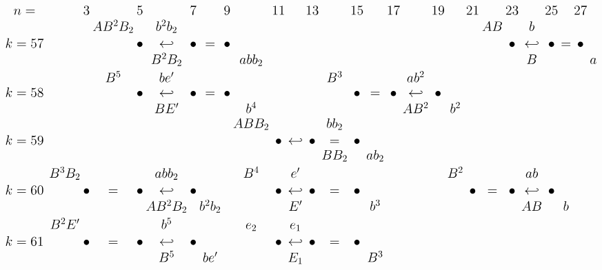 \documentclass{article}
\begin{document}
\(
\begin{tikzcd}[
nodes={font=\Large,inner sep=0pt},
row sep=0.2cm,
column sep=0.1cm
]
n=& && 3 & & 5 & & 7 & & 9 & & 11 & & 13 & & 15 & & 17 & & 19 & & 21 & & 23 && 25 && 27 \\
 && && AB^2B_2 && b^2b_2 && && && && && && && && AB && b \\
k=57& && && \bullet & \hookleftarrow & \bullet &=& \bullet && && && && && && && \bullet & \hookleftarrow & \bullet &=& \bullet \\
& & && && B^2B_2 && && abb_2 && && && && && && && B && && a \\
&& && B^5 && be' && && && && B^3 && && ab^2 \\
k=58& && && \bullet & \hookleftarrow & \bullet &=& \bullet && && && \bullet &=& \bullet &\hookleftarrow& \bullet \\
& & && && BE' && && b^4 && && && && AB^2 && b^2 \\ 
&& && && && && ABB_2 && && bb_2 \\
k=59& && && && && && \bullet & \hookleftarrow & \bullet &=& \bullet \\
& & && && && && && && BB_2 && ab_2 \\
&& B^3B_2 && && abb_2 && && B^4 && e' && && && && B^2 && && ab \\
k=60& && \bullet &=& \bullet &\hookleftarrow& \bullet && && \bullet & \hookleftarrow & \bullet & = & \bullet && && && \bullet &=& \bullet &\hookleftarrow& \bullet  \\
&& && && AB^2B_2 && b^2b_2 && && E' && && b^3 && && && && AB && b \\ 
&& B^2E' && && b^5 && && e_2 && e_1 && && && && \\
k=61& && \bullet &=& \bullet &\hookleftarrow& \bullet && && \bullet & \hookleftarrow & \bullet & = & \bullet \\
&& && && B^5 && be' && && E_1 && && B^3 && && \\
\end{tikzcd}
\)
\end{document}
